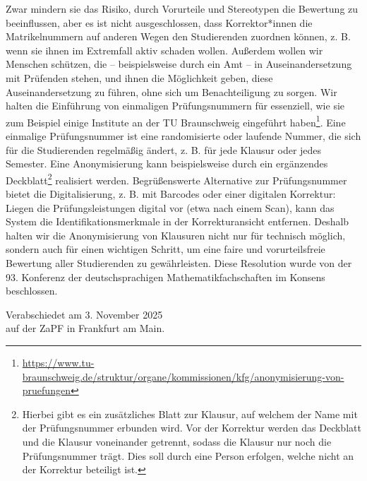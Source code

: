 \documentclass[DIV=calc]{scrartcl}
\begin{document}
Zwar mindern sie das Risiko, durch Vorurteile und Stereotypen die Bewertung zu
beeinflussen, aber es ist nicht ausgeschlossen, dass Korrektor*innen die
Matrikelnummern auf anderen Wegen den Studierenden zuordnen können, z. B. wenn sie  ihnen im Extremfall aktiv schaden wollen.
Außerdem wollen wir Menschen schützen, die – beispielsweise durch ein Amt – in
Auseinandersetzung mit Prüfenden stehen, und ihnen die Möglichkeit geben, diese
Auseinandersetzung zu führen, ohne sich um Benachteiligung zu sorgen.
Wir halten die Einführung von einmaligen Prüfungsnummern für essenziell, wie sie zum
Beispiel einige Institute an der TU Braunschweig eingeführt haben\footnote{\url{https://www.tu-braunschweig.de/struktur/organe/kommissionen/kfg/anonymisierung-von-pruefungen}}.
Eine einmalige Prüfungsnummer ist eine randomisierte oder laufende Nummer, die sich
für die Studierenden regelmäßig ändert, z. B. für jede Klausur oder jedes Semester.
Eine Anonymisierung kann beispielsweise durch ein ergänzendes Deckblatt\footnote{Hierbei gibt es ein zusätzliches Blatt zur Klausur, auf welchem der Name mit der Prüfungsnummer  erbunden wird. Vor der Korrektur werden das Deckblatt und die Klausur voneinander getrennt, sodass die Klausur nur noch die Prüfungsnummer trägt. Dies soll durch eine Person erfolgen, welche nicht an der Korrektur beteiligt ist. } realisiert
werden.
Begrüßenswerte Alternative zur Prüfungsnummer bietet die Digitalisierung, z. B. mit
Barcodes oder einer digitalen Korrektur:
Liegen die Prüfungsleistungen digital vor (etwa nach einem Scan), kann das System die
Identifikationsmerkmale in der Korrekturansicht entfernen.
Deshalb halten wir die Anonymisierung von Klausuren nicht nur für technisch möglich,
sondern auch für einen wichtigen Schritt, um eine faire und vorurteilsfreie Bewertung
aller Studierenden zu gewährleisten.
Diese Resolution wurde von der 93. Konferenz der deutschsprachigen
Mathematikfachschaften im Konsens beschlossen.




%
\vfill
\begin{flushright}
	Verabschiedet am 3. November 2025 \\
	auf der ZaPF in Frankfurt am Main.
\end{flushright}
\end{document}
